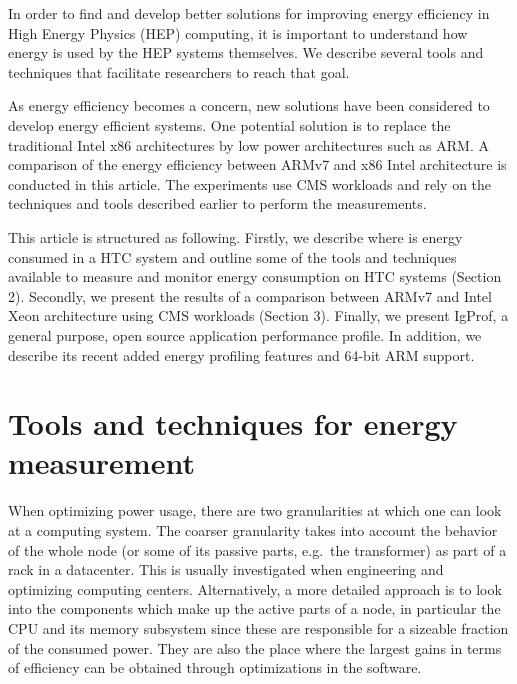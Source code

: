 
In order to find and develop better solutions for improving energy
efficiency in High Energy Physics (HEP) computing, it is important to understand
how energy is used by the HEP systems themselves. We describe several
tools and techniques that facilitate researchers to reach that goal.

As energy efficiency becomes a concern, new solutions have been
considered to develop energy efficient systems. One potential
solution is to replace the traditional Intel x86 architectures by
low power architectures such as ARM. A comparison of the energy
efficiency between ARMv7 and x86 Intel architecture is conducted
in this article. The experiments use CMS workloads and rely on the
techniques and tools described earlier to perform the measurements.

This article is structured as following. Firstly, we describe where
is energy consumed in a HTC system and outline some of
the tools and techniques available to measure and monitor energy
consumption on HTC systems (Section 2). Secondly, we present the results of a
comparison between ARMv7 and Intel Xeon architecture using CMS
workloads (Section 3). Finally, we present IgProf, a general purpose, open source
 application performance profile. In addition, we describe its recent added 
energy profiling features and 64-bit ARM support.

\section{Tools and techniques for energy measurement}

When optimizing power usage, there are two granularities at which
one can look at a computing system. The coarser granularity
takes into account the behavior of the whole node (or
some of its passive parts, e.g.\ the transformer) as part of a rack
in a datacenter. This is usually investigated when
engineering and optimizing computing centers. Alternatively,
a more detailed approach is to
look into the components which make up the active parts of a
node, in particular the CPU and its memory subsystem since these
are responsible for a sizeable fraction of the consumed power.
They are also the place where the largest gains in terms of efficiency 
can be obtained through optimizations in the software.

